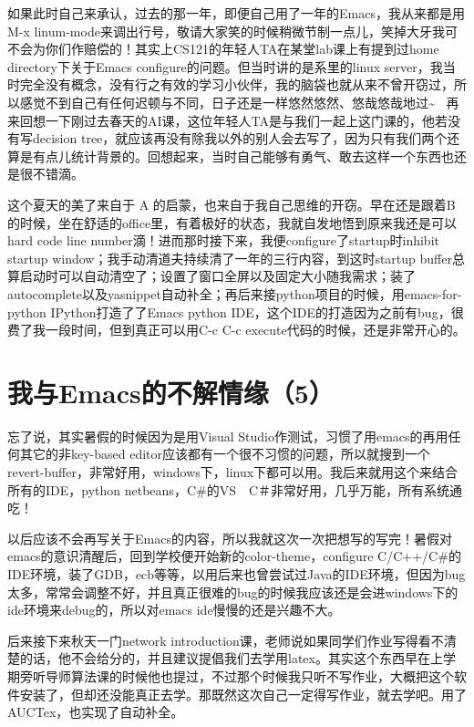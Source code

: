 \documentclass[12pt]{book}
\begin{document}
如果此时自己来承认，过去的那一年，即便自己用了一年的Emacs，我从来都是用M-x linum-mode来调出行号，敬请大家笑的时候稍微节制一点儿，笑掉大牙我可不会为你们作赔偿的！其实上CS121的年轻人TA在某堂lab课上有提到过home directory下关于Emacs configure的问题。但当时讲的是系里的linux server，我当时完全没有概念，没有行之有效的学习小伙伴，我的脑袋也就从来不曾开窃过，所以感觉不到自己有任何迟顿与不同，日子还是一样悠然悠然、悠哉悠哉地过\textasciitilde{}~ 再来回想一下刚过去春天的AI课，这位年轻人TA是与我们一起上这门课的，他若没有写decision tree，就应该再没有除我以外的别人会去写了，因为只有我们两个还算是有点儿统计背景的。回想起来，当时自己能够有勇气、敢去这样一个东西也还是很不错滴。

这个夏天的美了来自于 A 的启蒙，也来自于我自己思维的开窃。早在还是跟着B的时候，坐在舒适的office里，有着极好的状态，我就自发地悟到原来我还是可以hard code line number滴！进而那时接下来，我便configure了startup时inhibit startup window；我手动清道夫持续清了一年的三行内容，到这时startup buffer总算启动时可以自动清空了；设置了窗口全屏以及固定大小随我需求；装了autocomplete以及yasnippet自动补全；再后来接python项目的时候，用emacs-for-python IPython打造了了Emacs python IDE，这个IDE的打造因为之前有bug，很费了我一段时间，但到真正可以用C-c C-c execute代码的时候，还是非常开心的。


\section{我与Emacs的不解情缘（5）}
\label{sec-6-5}

忘了说，其实暑假的时候因为是用Visual Studio作测试，习惯了用emacs的再用任何其它的非key-based editor应该都有一个很不习惯的问题，所以就搜到一个revert-buffer，非常好用，windows下，linux下都可以用。我后来就用这个来结合所有的IDE，python netbeans，C\#的VS　C＃非常好用，几乎万能，所有系统通吃！

以后应该不会再写关于Emacs的内容，所以我就这次一次把想写的写完！暑假对emacs的意识清醒后，回到学校便开始新的color-theme，configure C/C++/C\#的IDE环境，装了GDB，ecb等等，以用后来也曾尝试过Java的IDE环境，但因为bug太多，常常会调整不好，并且真正很难的bug的时候我应该还是会进windows下的ide环境来debug的，所以对emacs ide慢慢的还是兴趣不大。　

后来接下来秋天一门network introduction课，老师说如果同学们作业写得看不清楚的话，他不会给分的，并且建议提倡我们去学用latex。其实这个东西早在上学期旁听导师算法课的时候他也提过，不过那个时候我只听不写作业，大概把这个软件安装了，但却还没能真正去学。那既然这次自己一定得写作业，就去学吧。用了AUCTex，也实现了自动补全。　
\end{document}
